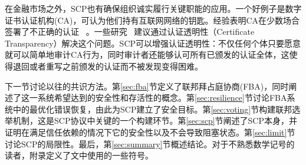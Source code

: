 在金融市场之外，SCP也有确保组织诚实履行关键职能的应用。一个好例子是数字证书认证机构(CA)，可认为他们持有互联网网络的钥匙。经验表明CA在少数场合签署了不正确的认证~\cite{ac_ms2013,dc_google2015} 。一些研究~\cite{Kim:2013up,ct_google2013,Basin:2014bn,cryptoeprint:2014:1004} 建议通过认证透明性（Certificate Transparency）解决这个问题。SCP可以增强认证透明性：不仅任何个体只要愿意就可以简单地审计CA行为，同时审计者还能够认可所有已颁发的认证全体，这使得退回或者重写之前颁发的认证而不被发现变得困难。

下一节讨论以往的共识方法。第\ref{sec:fba}节定义了联邦拜占庭协商(FBA)，同时阐述了这一系统希望达到的安全性和存活性的概念。第\ref{sec:resilience}节讨论FBA系统中的最优化错误恢复，由此为SCP建立了安全目标。第\ref{sec:voting}节构建联邦选举机制，这是SCP协议中关键的一个构建环节。第\ref{sec:scp}节阐述了SCP本身，并证明在满足信任依赖的情况下它的安全性以及不会导致阻塞状态。第\ref{sec:limit}节讨论SCP的局限性。最后，第\ref{sec:summary}节概述结论。对于不熟悉数学记号的读者，附录定义了文中使用的一些符号。